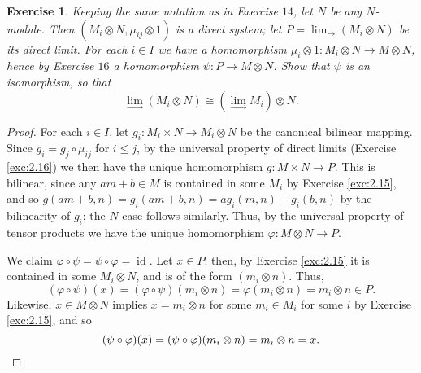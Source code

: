 \documentclass[12pt,letterpaper]{article}
\newtheorem{problem}{Exercise}[section]
\theoremstyle{definition}
\theoremstyle{remark}
\numberwithin{figure}{problem}
\numberwithin{equation}{section}
\DeclareMathOperator{\id}{id}
\begin{document}
\begin{problem}\label{exc:2.20}
  Keeping the same notation as in Exercise \href{exc:2.14}{$14$}, let $N$ be
  any $N$-module.
  Then $(M_i \otimes N, \mu_{ij} \otimes 1)$ is a direct system; let
  $P = \displaystyle\lim_{\longrightarrow}(M_i \otimes N)$ be its direct limit.
  For each $i \in I$ we have a homomorphism
  $\mu_i \otimes 1\colon M_i \otimes N \to M \otimes N$, hence by Exercise
  \href{exc:2.16}{$16$} a homomorphism $\psi\colon P \to M \otimes N$.
  Show that $\psi$ is an isomorphism, so that
  \begin{equation*}
    \lim_{\longrightarrow} (M_i \otimes N) \cong \left( \lim_{\longrightarrow} M_i \right) \otimes N.
  \end{equation*}
\end{problem}
\begin{proof}
  For each $i \in I$, let $g_i\colon M_i \times N \to M_i \otimes N$ be the
  canonical bilinear mapping.
  Since $g_i = g_j \circ \mu_{ij}$ for $i \le j$, by the universal property of
  direct limits (Exercise \ref{exc:2.16}) we then have the unique homomorphism
  $g\colon M \times N \to P$.
  This is bilinear, since any $am+b \in M$ is contained in some $M_i$ by
  Exercise \ref{exc:2.15}, and so
  $g(am+b,n) = g_i(am+b,n) = ag_i(m,n) + g_i(b,n)$ by the bilinearity of $g_i$;
  the $N$ case follows similarly.
  Thus, by the universal property of tensor products we have the unique
  homomorphism $\varphi\colon M \otimes N \to P$.
  \par We claim $\varphi \circ \psi = \psi \circ \varphi = \id$.
  Let $x \in P$; then, by Exercise \ref{exc:2.15} it is contained in some
  $M_i \otimes N$, and is of the form $(m_i \otimes n)$.
  Thus,
  \begin{equation*}
    (\varphi \circ \psi)(x) = (\varphi \circ \psi)(m_i \otimes n)
    = \varphi(m_i \otimes n) = m_i \otimes n \in P.
  \end{equation*}
  Likewise, $x \in M \otimes N$ implies $x = m_i \otimes n$ for some $m_i \in M_i$
  for some $i$ by Exercise \ref{exc:2.15}, and so
  \begin{equation*}
    (\psi \circ \varphi)(x) = (\psi \circ \varphi)(m_i \otimes n) = m_i \otimes
    n = x.\qedhere
  \end{equation*}
\end{proof}
\end{document}
